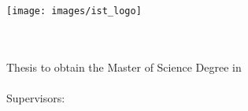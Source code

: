 
\begin{titlepage}
\texttt{[image: images/ist\_logo]}~\\
%
\if{}
  \vspace*{\finalLogoSpacing}
\else
  \vspace*{\draftLogoSpacing}
\fi

\begin{center}
\if{}
\vspace*{1.5cm}
\fi
{\LARGE \textbf{\Title}}\\[1.0cm]
\if{}
\vspace*{0.8cm}
\fi
\if{}
\vspace*{0.3cm}
\fi
{\Large \textbf{\StudentName}}\\[1.0cm]
\if{}
\vspace*{0.3cm}
\fi
{\large Thesis to obtain the Master of Science Degree in}\\[0.5cm]
{\LARGE \textbf{\DegreeName}}\\[1.0cm]
    {\large Supervisors:\:}

\end{center}
\end{titlepage}
